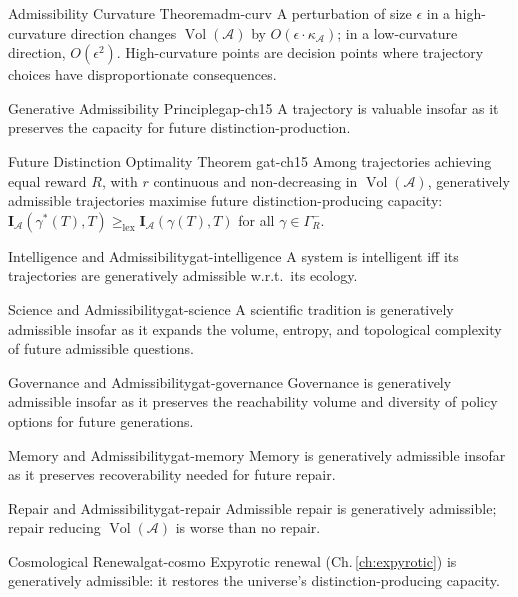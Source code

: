 \documentclass[12pt,twoside,openright]{book}
\newcommand{\adm}{\mathcal{A}}
\newcommand{\Vol}{\operatorname{Vol}}
\begin{document}
\begin{theorem}{Admissibility Curvature Theorem}{adm-curv}
  A perturbation of size $\epsilon$ in a high-curvature
  direction changes $\Vol(\adm)$ by
  $O(\epsilon\cdot\kappa_\adm)$; in a low-curvature
  direction, $O(\epsilon^2)$.
  High-curvature points are decision points where
  trajectory choices have disproportionate consequences.
\end{theorem}

\begin{principle}{Generative Admissibility Principle}{gap-ch15}
  A trajectory is valuable insofar as it preserves the
  capacity for future distinction-production.
\end{principle}

\begin{theorem}{Future Distinction Optimality Theorem}%
  {gat-ch15}
  Among trajectories achieving equal reward $R$, with
  $r$ continuous and non-decreasing in $\Vol(\adm)$,
  generatively admissible trajectories maximise
  future distinction-producing capacity:
  $\mathbf{I}_\adm(\gamma^*(T),T)
  \ge_\mathrm{lex}\mathbf{I}_\adm(\gamma(T),T)$
  for all $\gamma\in\Gamma_R^-$.
\end{theorem}

\begin{corollary}{Intelligence and Admissibility}{gat-intelligence}
  A system is intelligent iff its trajectories are
  generatively admissible w.r.t.\ its ecology.
\end{corollary}
\begin{corollary}{Science and Admissibility}{gat-science}
  A scientific tradition is generatively admissible insofar
  as it expands the volume, entropy, and topological
  complexity of future admissible questions.
\end{corollary}
\begin{corollary}{Governance and Admissibility}{gat-governance}
  Governance is generatively admissible insofar as it
  preserves the reachability volume and diversity of
  policy options for future generations.
\end{corollary}
\begin{corollary}{Memory and Admissibility}{gat-memory}
  Memory is generatively admissible insofar as it
  preserves recoverability needed for future repair.
\end{corollary}
\begin{corollary}{Repair and Admissibility}{gat-repair}
  Admissible repair is generatively admissible;
  repair reducing $\Vol(\adm)$ is worse than no repair.
\end{corollary}
\begin{corollary}{Cosmological Renewal}{gat-cosmo}
  Expyrotic renewal (Ch.\,\ref{ch:expyrotic}) is
  generatively admissible: it restores the universe's
  distinction-producing capacity.
\end{corollary}
\end{document}
